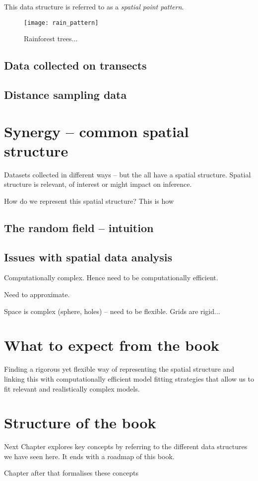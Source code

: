 This data structure is referred to as a \textit{spatial point pattern}.
\begin{figure}
\centering
\texttt{[image: rain\_pattern]}
\caption{\label{fig:pattern} Rainforest trees...}
\end{figure}




\subsection{Data collected on transects}
\subsection{Distance sampling data}


\section{Synergy -- common spatial structure}
Datasets collected in different ways -- but the all have 
a spatial structure. Spatial structure is relevant, of interest or might impact on inference.

How do we represent this spatial structure? This is how 

\subsection{The random field -- intuition}



\subsection{Issues with spatial data analysis}

Computationally complex. Hence need to be computationally efficient.

Need to approximate.

Space is complex (sphere, holes) -- need to be flexible. Grids are rigid... 

\section{What to expect from the book}


Finding a rigorous yet flexible way of representing the spatial structure and linking this with computationally efficient model fitting strategies that allow us to fit relevant and realistically complex models.

\section{Structure of the book}

Next Chapter explores key concepts by referring to the different data structures we have seen here. It ends with a roadmap of this book.
 
Chapter after that formalises these concepts




